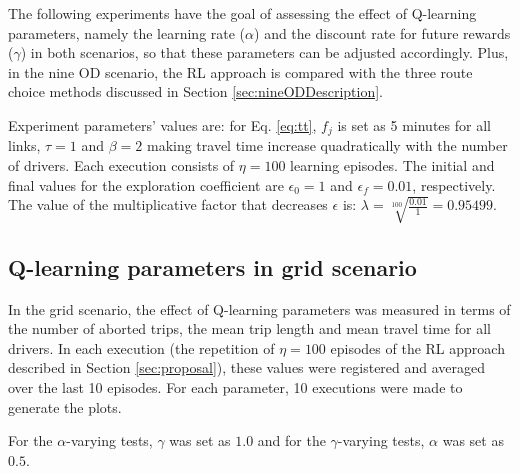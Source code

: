 \documentclass{RITA}
\newcommand{\fftt}{\ensuremath{f_j}} 		%
\newcommand{\numepis}{\ensuremath{\eta}}	%
\begin{document}
The following experiments have the goal of assessing the effect of Q-learning parameters, namely the learning rate ($\alpha$) and the discount rate for future rewards ($\gamma$) in both scenarios, so that these parameters can be adjusted accordingly. Plus, in the nine OD scenario, the RL approach is compared with the three route choice methods discussed in Section \ref{sec:nineODDescription}.

Experiment parameters' values are: for Eq. \eqref{eq:tt}, $\fftt$ is set as 5 minutes for all links, $\tau = 1$ and $\beta = 2$ making travel time increase quadratically with the number of drivers. Each execution consists of $\numepis = 100$ learning episodes. The initial and final values for the exploration coefficient are $\epsilon_0 = 1$ and $\epsilon_f = 0.01$, respectively. The value of the multiplicative factor that decreases $\epsilon$ is: $\lambda = \sqrt[100]{\frac{0.01}{1}} = 0.95499$.


\subsection{Q-learning parameters in grid scenario}


In the grid scenario, the effect of Q-learning parameters was measured in terms of the number of aborted trips, the mean trip length and mean travel time for all drivers. In each execution (the repetition of $\numepis = 100$ episodes of the RL approach described in Section \ref{sec:proposal}), these values were registered and averaged over the last 10 episodes. For each parameter, 10 executions were made to generate the plots.

For the $\alpha$-varying tests, $\gamma$ was set as $1.0$ and for the $\gamma$-varying tests, $\alpha$ was set as $0.5$.
\end{document}
